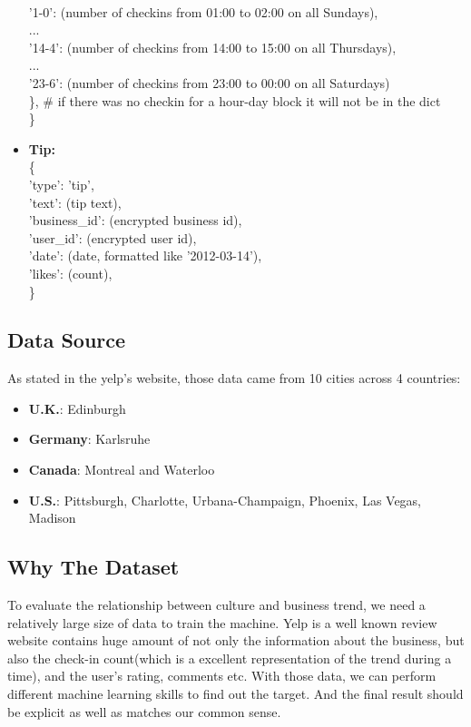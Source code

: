 \documentclass{article}
\newcommand\tab[1][1cm]{\hspace*{#1}}
\begin{document}
\begin{itemize}
\\ \tab	        '1-0': (number of checkins from 01:00 to 02:00 on all Sundays),
\\ \tab	        ...
\\ \tab	        '14-4': (number of checkins from 14:00 to 15:00 on all Thursdays),
\\ \tab	        ...
\\ \tab	        '23-6': (number of checkins from 23:00 to 00:00 on all Saturdays)
\\ \tab	    \}, \# if there was no checkin for a hour-day block it will not be in the dict
\\ \}
\item \textbf{Tip:} \hfill 
\\ \{
\\ \tab	    'type': 'tip',
\\ \tab	    'text': (tip text),
\\ \tab	    'business\_id': (encrypted business id),
\\ \tab	    'user\_id': (encrypted user id),
\\ \tab	    'date': (date, formatted like '2012-03-14'),
\\ \tab	    'likes': (count),
\\ \}

\end{itemize}

\subsection{Data Source}
As stated in the yelp's website, those data came from 10 cities across 4 countries:
\begin{itemize}

\item \textbf{U.K.}: Edinburgh
\item \textbf{Germany}: Karlsruhe
\item \textbf{Canada}: Montreal and Waterloo
\item \textbf{U.S.}: Pittsburgh, Charlotte, Urbana-Champaign, Phoenix, Las Vegas,
 Madison
  \end{itemize}
  
\subsection{Why The Dataset}
To evaluate the relationship between culture and business trend, we need a relatively large size of data to train the machine. Yelp is a well known review website contains huge amount of not only the information about the business, but also the check-in count(which is a excellent representation of the trend during a time), and the user's rating, comments etc. With those data, we can perform different machine learning skills to find out the target. And the final result should be explicit as well as matches our common sense.
\end{document}
